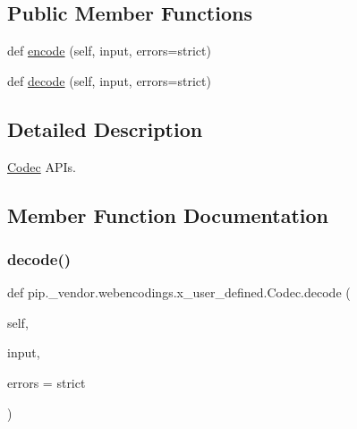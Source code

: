 \subsection*{Public Member Functions}
\begin{DoxyCompactItemize}
\item 
def \hyperlink{classpip_1_1__vendor_1_1webencodings_1_1x__user__defined_1_1Codec_a308a5571cc1db0a4303c3a299e7eb423}{encode} (self, input, errors=\textquotesingle{}strict\textquotesingle{})
\item 
def \hyperlink{classpip_1_1__vendor_1_1webencodings_1_1x__user__defined_1_1Codec_a3ad85582a1eb423daee2c37988a70fe4}{decode} (self, input, errors=\textquotesingle{}strict\textquotesingle{})
\end{DoxyCompactItemize}


\subsection{Detailed Description}
\hyperlink{classpip_1_1__vendor_1_1webencodings_1_1x__user__defined_1_1Codec}{Codec} A\+P\+Is. 

\subsection{Member Function Documentation}
\mbox{\label{classpip_1_1__vendor_1_1webencodings_1_1x__user__defined_1_1Codec_a3ad85582a1eb423daee2c37988a70fe4}} 
\subsubsection{\texorpdfstring{decode()}{decode()}}
{\footnotesize\ttfamily def pip.\+\_\+vendor.\+webencodings.\+x\+\_\+user\+\_\+defined.\+Codec.\+decode (\begin{DoxyParamCaption}\item[{}]{self,  }\item[{}]{input,  }\item[{}]{errors = {\ttfamily \textquotesingle{}strict\textquotesingle{}} }\end{DoxyParamCaption})}

